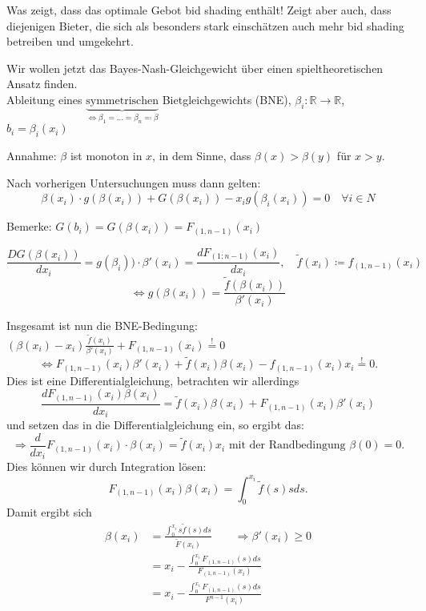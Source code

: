 \documentclass[12pt]{extreport} %
\theoremstyle{named}
\theoremstyle{itshape}
\theoremstyle{normal}
\begin{document}
Was zeigt, dass das optimale Gebot bid shading enthält! Zeigt aber auch, dass diejenigen Bieter, die sich als besonders stark einschätzen auch mehr bid shading betreiben und umgekehrt.

Wir wollen jetzt das Bayes-Nash-Gleichgewicht über einen spieltheoretischen Ansatz finden.  \\

Ableitung eines $\underbrace{\text{symmetrischen}}_{\iff \beta_{1} = \dotsc = \beta_{n} \eqqcolon \beta}$ Bietgleichgewichts (BNE), $\beta_{i} \colon \mathbb{R} \rightarrow \mathbb{R}$, $b_{i} = \beta_{i}(x_{i})$

Annahme: $\beta$ ist monoton in $x$, in dem Sinne, dass $\beta(x) > \beta(y)$ für $x > y$.

Nach vorherigen Untersuchungen muss dann gelten:
$$ \beta(x_i) \cdot g(\beta(x_{i})) + G(\beta(x_{i})) - x_{i} g(\beta_{i}(x_{i})) = 0 \quad \forall i \in N $$

Bemerke: $G(b_{i}) = G(\beta(x_{i})) = F_{(1,n-1)}(x_{i})$

$$ \frac{D G(\beta(x_{i}))}{d x_{i}} = g(\beta_{i})) \cdot \beta'(x_{i}) = \frac{d F_{(1:n-1)}(x_{i})}{dx_{i}}, \quad \tilde{f}(x_{i}) \coloneqq f_{(1, n-1)}(x_{i}) $$
$$ \iff g(\beta(x_{i})) = \frac{\tilde{f}(\beta(x_{i}))}{\beta'(x_{i})} $$

Insgesamt ist nun die BNE-Bedingung: $(\beta(x_{i}) - x_{i}) \frac{\tilde{f}(x_{i})}{\beta'(x_{i})} + F_{(1,n-1)}(x_{i}) \overset{!}{=} 0$
$$ \iff F_{(1, n-1)}(x_{i}) \beta'(x_{i}) + \tilde{f}(x_{i}) \beta(x_{i}) - f_{(1, n-1)}(x_{i}) x_{i} \overset{!}{=} 0. $$
Dies ist eine Differentialgleichung, betrachten wir allerdings
$$ \frac{d F_{(1,n-1)}(x_{i}) \beta(x_{i})}{d x_{i}} = \tilde{f}(x_{i}) \beta(x_{i}) + F_{(1, n-1)}(x_{i}) \beta'(x_{i}) $$
und setzen das in die Differentialgleichung ein, so ergibt das:
$$ \Rightarrow \frac{d}{dx_{i}} F_{(1,n-1)}(x_{i}) \cdot \beta(x_{i}) = \tilde{f}(x_{i}) x_{i} \text{ mit der Randbedingung } \beta(0) = 0. $$
Dies können wir durch Integration lösen:
$$ F_{(1, n-1)}(x_{i}) \beta(x_{i}) = \int_{0}^{x_{i}}  \tilde{f}(s) s ds. $$
Damit ergibt sich
\begin{align*}
	\beta(x_{i}) & = \frac{\int_{0}^{x_{i}} s \tilde{f}(s) ds}{\tilde{F}(x_{i})} \qquad \Rightarrow \beta'(x_{i}) \geq 0 \\
	& = x_{i} - \frac{\int_{0}^{x_{i}} F_{(1, n-1)}(s) ds}{F_{(1,n-1)}(x_{i})} \\
	& = x_{i} - \frac{\int_{0}^{x_{i}} F_{(1,n-1)}(s) ds}{F^{n-1}(x_{i})} 
\end{align*}
\end{document}

